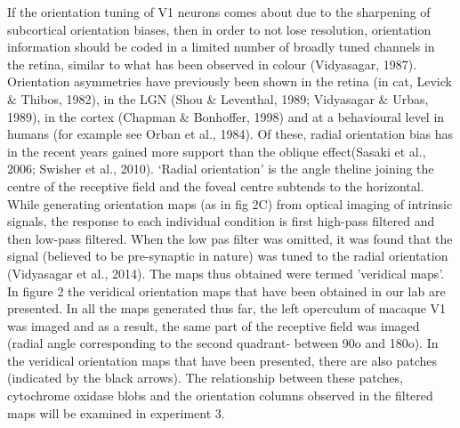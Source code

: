 	If the orientation tuning of V1 neurons comes about due to the sharpening of subcortical orientation biases, then in order to not lose resolution, orientation information should be coded in a limited number of broadly tuned channels in the retina, similar to what has been observed in colour (Vidyasagar, 1987). Orientation asymmetries have previously been shown in the retina (in cat, Levick \& Thibos, 1982), in the LGN (Shou \& Leventhal, 1989; Vidyasagar \& Urbas, 1989), in the cortex (Chapman \& Bonhoffer, 1998) and at a behavioural level in humans (for example see Orban et al., 1984). Of these, radial orientation bias has in the recent years gained more support than the oblique effect(Sasaki et al., 2006; Swisher et al., 2010). ‘Radial orientation' is the angle theline joining the centre of the receptive field and the foveal centre subtends to the horizontal. While generating orientation maps (as in fig 2C) from optical imaging of intrinsic signals, the response to each individual condition is first high-pass filtered and then low-pass filtered. When the low pas filter was omitted, it was found that the signal (believed to be pre-synaptic in nature) was tuned to the radial orientation (Vidyasagar et al., 2014). The maps thus obtained were termed 'veridical maps'. In figure 2 the veridical orientation maps that have been obtained in our lab are presented. In all the maps generated thus far, the left operculum of macaque V1 was imaged and as a result, the same part of the receptive field was imaged (radial angle corresponding to the second quadrant- between 90o and 180o). In the veridical orientation maps that have been presented, there are also patches (indicated by the black arrows). The relationship between these patches, cytochrome oxidase blobs and the orientation columns observed in the filtered maps will be examined in experiment 3.
	
